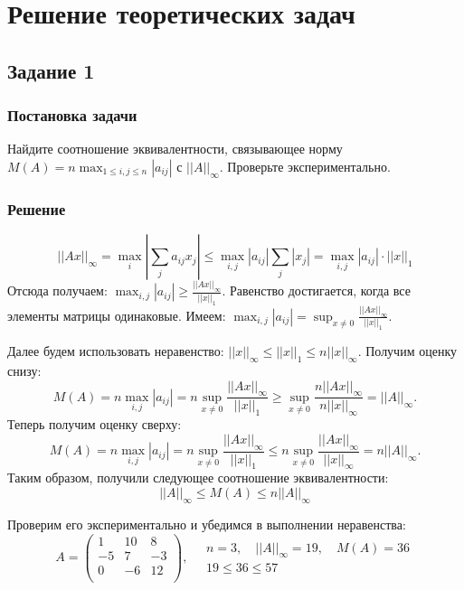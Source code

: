 \section{Решение теоретических задач}
    \subsection{Задание 1}
        \subsubsection{Постановка задачи}
            Найдите соотношение эквивалентности, связывающее норму\\ $M(A) = n \max_{1 \leq i,j \leq n}{|a_{ij}|}$ с $ || A ||_\infty $. Проверьте экспериментально.
    
        \subsubsection{Решение}
            \noindent
            \[
                ||Ax||_\infty = \max_i \left| \sum_{j} a_{ij} x_j \right| \leq \max_{i,j}| a_{ij} | \sum_{j} |x_j| = \max_{i,j} |a_{ij}| \cdot ||x||_1
            \]
            Отсюда получаем: $ \max_{i,j} |a_{ij}| \geq \frac{||Ax||_\infty}{||x||_1} $. Равенство достигается, когда все элементы матрицы одинаковые. Имеем: $ \max_{i,j} |a_{ij}| = \sup_{x \neq 0} \frac{||Ax||_\infty}{||x||_1} $.

            Далее будем использовать неравенство: $ ||x||_\infty \leq ||x||_1 \leq n ||x||_\infty $. Получим оценку снизу:
            \[
                M(A) = n \max_{i,j}{|a_{ij}|} = n \sup_{x \neq 0} \frac{||Ax||_\infty}{||x||_1} \geq \sup_{x \neq 0} \frac{n||Ax||_\infty}{n||x||_\infty} = ||A||_\infty.
            \]
            Теперь получим оценку сверху:
            \[
                M(A) = n \max_{i,j}{|a_{ij}|} = n \sup_{x \neq 0} \frac{||Ax||_\infty}{||x||_1} \leq n \sup_{x \neq 0} \frac{||Ax||_\infty}{||x||_\infty} = n||A||_\infty.
            \]
            Таким образом, получили следующее соотношение эквивалентности:
            $$ ||A||_\infty \leq M(A) \leq n||A||_\infty $$ 

            Проверим его экспериментально и убедимся в выполнении неравенства:
            \[
                A = \left(
                    \begin{matrix}
                        1 & 10 & 8 \\
                        -5 & 7 & -3 \\
                        0 & -6 & 12 \\
                    \end{matrix}
                \right), \quad
                \begin{matrix}
                    n = 3, \quad
                    ||A||_\infty = 19, \quad
                    M(A) = 36 \\

                    19 \leq 36 \leq 57
                \end{matrix}
            \]


